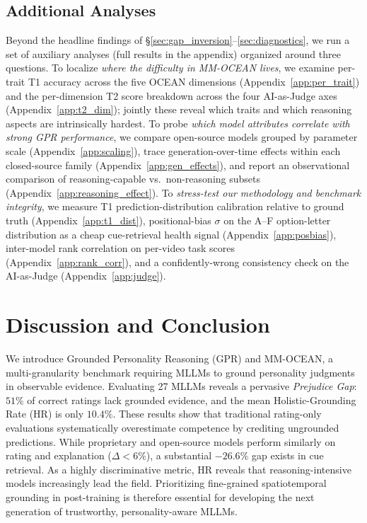 \documentclass{llmxive}
\providecommand{\taskname}{Grounded Personality Reasoning}
\providecommand{\taskabbr}{GPR}
\providecommand{\benchname}{MM-OCEAN}
\providecommand{\gapinv}{Prejudice Gap}
\begin{document}
\subsection{Additional Analyses}
\label{sec:additional}

Beyond the headline findings of \S\ref{sec:gap_inversion}--\ref{sec:diagnostics}, we run a set of auxiliary analyses (full results in the appendix) organized around three questions. To localize \emph{where the difficulty in \benchname{} lives}, we examine per-trait T1 accuracy across the five OCEAN dimensions (Appendix~\ref{app:per_trait}) and the per-dimension T2 score breakdown across the four AI-as-Judge axes (Appendix~\ref{app:t2_dim}); jointly these reveal which traits and which reasoning aspects are intrinsically hardest. To probe \emph{which model attributes correlate with strong \taskabbr{} performance}, we compare open-source models grouped by parameter scale (Appendix~\ref{app:scaling}), trace generation-over-time effects within each closed-source family (Appendix~\ref{app:gen_effects}), and report an observational comparison of reasoning-capable vs.\ non-reasoning subsets (Appendix~\ref{app:reasoning_effect}). To \emph{stress-test our methodology and benchmark integrity}, we measure T1 prediction-distribution calibration relative to ground truth (Appendix~\ref{app:t1_dist}), positional-bias $\sigma$ on the A--F option-letter distribution as a cheap cue-retrieval health signal (Appendix~\ref{app:posbias}), inter-model rank correlation on per-video task scores (Appendix~\ref{app:rank_corr}), and a confidently-wrong consistency check on the AI-as-Judge (Appendix~\ref{app:judge}).

\section{Discussion and Conclusion}
\label{sec:conclusion}

We introduce \taskname{} (\taskabbr{}) and \benchname{}, a multi-granularity benchmark requiring MLLMs to ground personality judgments in observable evidence. Evaluating 27 MLLMs reveals a pervasive \emph{\gapinv{}}: $51\%$ of correct ratings lack grounded evidence, and the mean Holistic-Grounding Rate (HR) is only $10.4\%$. These results show that traditional rating-only evaluations systematically overestimate competence by crediting ungrounded predictions. While proprietary and open-source models perform similarly on rating and explanation ($\Delta < 6\%$), a substantial $-26.6\%$ gap exists in cue retrieval. As a highly discriminative metric, HR reveals that reasoning-intensive models increasingly lead the field. Prioritizing fine-grained spatiotemporal grounding in post-training is therefore essential for developing the next generation of trustworthy, personality-aware MLLMs.
\end{document}
